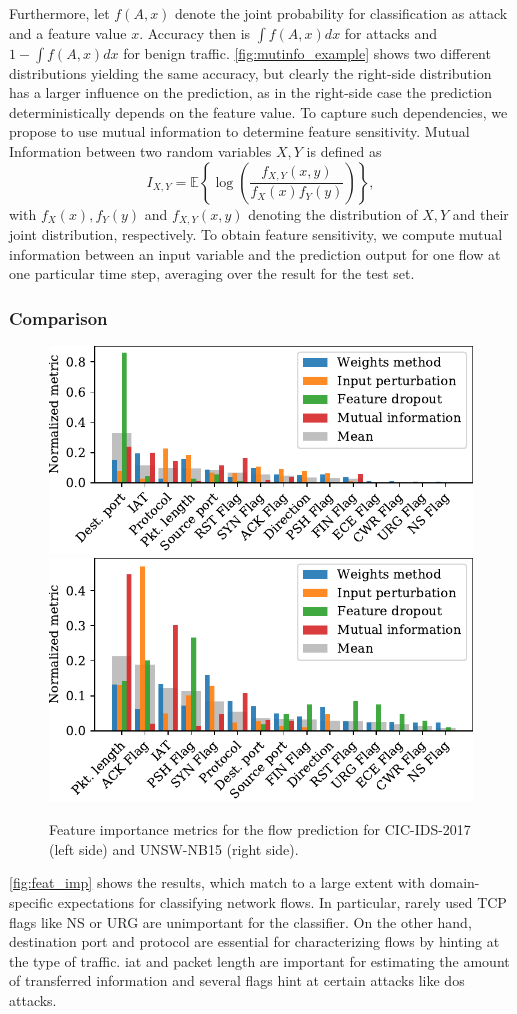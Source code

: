 \documentclass[conference]{IEEEtran}
\newcommand\note[2]{{\color{#1}#2}}
\newcommand\todo[1]{{\note{red}{TODO: #1}}}
\begin{document}
Furthermore, let $f(A,x)$  denote the joint probability
for classification as attack and a feature value $x$. Accuracy then is $\int f(A,x) dx$ for attacks and $1-\int f(A,x) dx$ for benign traffic.
\autoref{fig:mutinfo_example} shows two different distributions
yielding the same accuracy, but clearly the right-side distribution has a larger influence on the prediction, as in the right-side case the prediction deterministically depends on the feature value.
To capture such dependencies, we propose to use mutual information %
to determine feature sensitivity.
Mutual Information between two random variables $X,Y$ is defined as
\begin{equation}
I_{X,Y} = \mathbb E \left\{ \log\left(\frac{f_{X,Y}(x,y)}{f_X(x)f_Y(y)}\right) \right\},
\end{equation}
with $f_X(x), f_Y(y)$ and $f_{X,Y}(x,y)$ denoting the distribution of $X,Y$ and their joint distribution, respectively. To obtain feature sensitivity, we compute mutual information between an input variable and the prediction output for one flow at one particular time step, averaging over the result for the test set.

\subsubsection{Comparison}
\begin{figure}
\includegraphics[width=.49\textwidth]{../plots/importance/feat_imp_flow_2017.pdf}\hspace{.02\textwidth}
\includegraphics[width=.49\textwidth]{../plots/importance/feat_imp_flow_2015.pdf}
\caption{Feature importance metrics for the flow prediction for CIC-IDS-2017 (left side) and UNSW-NB15 (right side).}
\label{fig:feat_imp}
\end{figure}
\autoref{fig:feat_imp} shows the results, which match to a large extent with domain-specific expectations for classifying network flows.
In particular, rarely used TCP flags like NS or URG are unimportant for the classifier. On the other hand, destination port and protocol are essential for characterizing flows by hinting at the type of traffic. \gls{iat} and packet length are important for estimating the amount of transferred information and several flags hint at certain attacks like \gls{dos} attacks.
\end{document}
